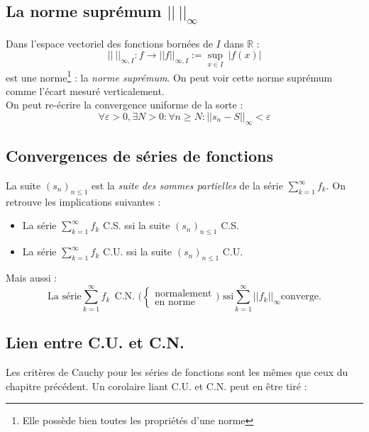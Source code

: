 \documentclass[british,french,11pt, a4paper, openany]{book}
\newcommand{\serie}{\sum_{k=1}^\infty}
\begin{document}
		\subsection{La norme suprémum $||\ ||_\infty$}
		Dans l'espace vectoriel des fonctions bornées de $I$ dans $\mathbb{R}$ :
		\begin{equation}
			||\ ||_{\infty, I} : f \rightarrow ||f||_{\infty, I} := \sup\limits_{x \in I}\ |f(x)|
		\end{equation}
		est une norme\footnote{Elle possède bien toutes les propriétés d'une norme} : la \textit{norme suprémum}. On peut voir cette norme suprémum comme l'écart mesuré verticalement. \\
		On peut re-écrire la convergence uniforme de la sorte :
		\begin{equation}
			\forall \varepsilon > 0, \exists N >0: \forall n \geq N :  ||s_n - S||_\infty < \varepsilon
		\end{equation}
							
		\setcounter{subsection}{4}
		\subsection{Convergences de séries de fonctions}
		La suite $(s_n)_{n\leq 1}$ est la \textit{suite des sommes partielles} de la série $\serie f_k$. On retrouve les implications suivantes :
		\begin{itemize}
			\item La série $\serie f_k$ C.S. ssi la suite $(s_n)_{n\leq 1}$ C.S.
			\item La série $\serie f_k$ C.U. ssi la suite $(s_n)_{n\leq 1}$ C.U. 
		\end{itemize}
		Mais aussi :
		\begin{equation}
			\text{La série} \serie f_k\ \ \text{C.N. ($\left\{\begin{array}{l}
				\text{normalement}\\
				\text{en norme}
				\end{array}\right.$) ssi} \serie ||f_k||_\infty \text{converge}.
		\end{equation}
							
		\setcounter{subsection}{6}
		\subsection{Lien entre C.U. et C.N.}
		Les critères de Cauchy pour les séries de fonctions sont les mêmes que ceux du chapitre précédent. Un corolaire liant C.U. et C.N. peut en être tiré :
		\corollaire{\begin{equation}
			\serie f_k\ \ \text{C.N.}\ \ \underset{\nLeftarrow}{\Rightarrow}\ \ \serie f_k\ \ \text{C.U.}
			\end{equation}}
							
\end{document}

